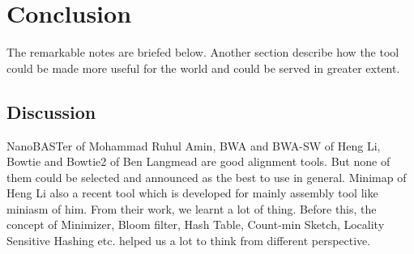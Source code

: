 \documentclass{standalone}
\begin{document}
\chapter{Conclusion}
The remarkable notes are briefed below. Another section describe how the tool could be made more useful for the world and could be served in greater extent.
\section{Discussion}
NanoBASTer\cite{nanoBLAST} of Mohammad Ruhul Amin, BWA\cite{BWA_short} and BWA-SW\cite{BWA_long} of Heng Li, Bowtie\cite{bowtie} and Bowtie2\cite{bowtie2} of Ben Langmead are good alignment tools. But none of them could be selected and announced as the best to use in general. Minimap\cite{minimap} of Heng Li also a recent tool which is developed for mainly assembly tool like miniasm\cite{minimap} of him. From their work, we learnt a lot of thing. Before this, the concept of Minimizer\cite{KMC2,KMC}, Bloom filter\cite{BFCounter,turtle}, Hash Table\cite{corman,jellyfish}, Count-min Sketch\cite{minsketch}, Locality Sensitive Hashing\cite{LSH} etc. helped us a lot to think from different perspective.
\end{document}
